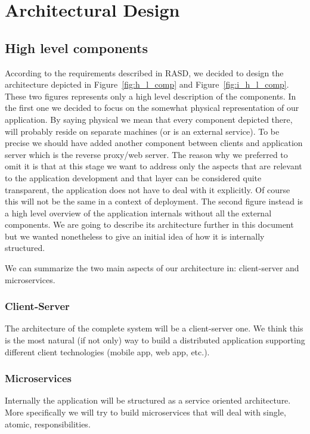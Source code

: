 \pagebreak
\section{Architectural Design}
 
\subsection{High level components}
According to the requirements described in RASD, we decided to design the architecture depicted
in Figure~\ref{fig:h_l_comp} and Figure~\ref{fig:i_h_l_comp}. These two figures represents
only a high level description of the components. In the first one we decided to focus on
the somewhat physical representation of our application. By saying physical we mean that
every component depicted there, will probably reside on separate machines (or is an external service).
To be precise we should have added another component between clients and
application server which is the reverse proxy/web server. The reason why we preferred to
omit it is that at this stage we want to address only the aspects that are relevant to the
application development and that layer can be considered quite transparent, the application
does not have to deal with it explicitly. Of course this will not be the same in a context of deployment.
The second figure instead is a high level overview of the application internals without all
the external components. We are going to describe its architecture further in this document
but we wanted nonetheless to give an initial idea of how it is internally structured.

We can summarize the two main aspects of our architecture in: client-server and microservices.

\subsubsection{Client-Server}
The architecture of the complete system will be a client-server one. We think this is the
most natural (if not only) way to build a distributed application supporting different
client technologies (mobile app, web app, etc.).

\subsubsection{Microservices}
Internally the application will be structured as a service oriented architecture.
More specifically we will try to build microservices that will deal with single, atomic, responsibilities.

